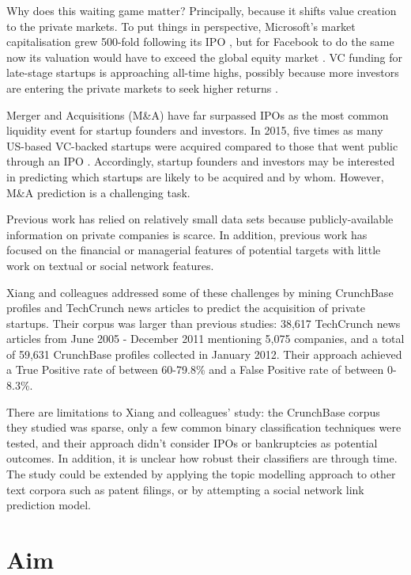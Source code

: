 \documentclass[../thesis/thesis.tex]{subfiles}
\begin{document}
Why does this waiting game matter? Principally, because it shifts value creation to the private markets. To put things in perspective, Microsoft’s market capitalisation grew 500-fold following its IPO \cite{mcnamara2011}, but for Facebook to do the same now its valuation would have to exceed the global equity market \cite{raice2012}. VC funding for late-stage startups is approaching all-time highs, possibly because more investors are entering the private markets to seek higher returns \cite{nvca2016}.

Merger and Acquisitions (M\&A) have far surpassed IPOs as the most common liquidity event for startup founders and investors. In 2015, five times as many US-based VC-backed startups were acquired compared to those that went public through an IPO \cite{nvca2016}. Accordingly, startup founders and investors may be interested in predicting which startups are likely to be acquired and by whom. However, M\&A prediction is a challenging task.

Previous work has relied on relatively small data sets \cite{wei2008} because publicly-available information on private companies is scarce. In addition, previous work has focused on the financial or managerial features of potential targets \cite{hongjiu2007} with little work on textual or social network features.

Xiang and colleagues \cite{xiang2012} addressed some of these challenges by mining CrunchBase profiles and TechCrunch news articles to predict the acquisition of private startups. Their corpus was larger than previous studies: 38,617 TechCrunch news articles from June 2005 - December 2011 mentioning 5,075 companies, and a total of 59,631 CrunchBase profiles collected in January 2012. Their approach achieved a True Positive rate of between 60-79.8\% and a False Positive rate of between 0-8.3\%.

There are limitations to Xiang and colleagues' study: the CrunchBase corpus they studied was sparse, only a few common binary classification techniques were tested, and their approach didn't consider IPOs or bankruptcies as potential outcomes. In addition, it is unclear how robust their classifiers are through time. The study could be extended by applying the topic modelling approach to other text corpora such as patent filings, or by attempting a social network link prediction model.

\section*{Aim}
\end{document}
